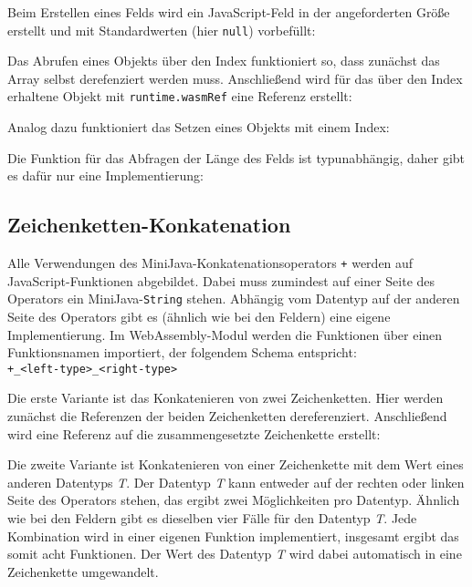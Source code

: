 Beim Erstellen eines Felds wird ein JavaScript-Feld in der angeforderten Größe erstellt und mit Standardwerten (hier \lstinline{null}) vorbefüllt:


Das Abrufen eines Objekts über den Index funktioniert so, dass zunächst das Array selbst derefenziert werden muss. Anschließend wird für das über den Index erhaltene Objekt mit \lstinline{runtime.wasmRef} eine Referenz erstellt:


Analog dazu funktioniert das Setzen eines Objekts mit einem Index:


Die Funktion für das Abfragen der Länge des Felds ist typunabhängig, daher gibt es dafür nur eine Implementierung:



\subsection{Zeichenketten-Konkatenation}
\label{subsec:JavaScript-Zeichenketten-Konkatenation}

Alle Verwendungen des MiniJava-Konkatenationsoperators \lstinline{+} werden auf JavaScript-Funktionen abgebildet. Dabei muss zumindest auf einer Seite des Operators ein Mi\-ni\-Ja\-va-\lstinline{String} stehen. Abhängig vom Datentyp auf der anderen Seite des Operators gibt es (ähnlich wie bei den Feldern) eine eigene Implementierung. Im WebAssembly-Modul werden die Funktionen über einen Funktionsnamen importiert, der folgendem Schema entspricht: \\
\lstinline{+_<left-type>_<right-type>}

Die erste Variante ist das Konkatenieren von zwei Zeichenketten. Hier werden zunächst die Referenzen der beiden Zeichenketten dereferenziert. Anschließend wird eine Referenz auf die zusammengesetzte Zeichenkette erstellt:


Die zweite Variante ist Konkatenieren von einer Zeichenkette mit dem Wert eines anderen Datentyps \emph{T}. Der Datentyp \emph{T} kann entweder auf der rechten oder linken Seite des Operators stehen, das ergibt zwei Möglichkeiten pro Datentyp. Ähnlich wie bei den Feldern gibt es dieselben vier Fälle für den Datentyp \emph{T}. Jede Kombination wird in einer eigenen Funktion implementiert, insgesamt ergibt das somit acht Funktionen. Der Wert des Datentyp \emph{T} wird dabei automatisch in eine Zeichenkette umgewandelt.

